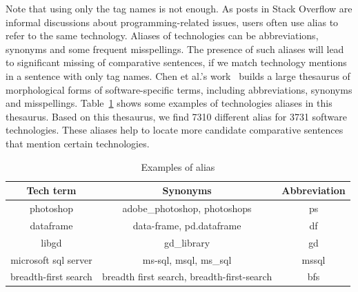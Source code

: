 Note that using only the tag names is not enough.
As posts in Stack Overflow are informal discussions about programming-related issues, users often use alias to refer to the same technology.
Aliases of technologies can be abbreviations, synonyms and some frequent misspellings.
The presence of such aliases will lead to significant missing of comparative sentences, if we match technology mentions in a sentence with only tag names.
Chen et al.'s work~\cite{chen2019sethesaurus} builds a large thesaurus of morphological forms of software-specific terms, including abbreviations, synonyms and misspellings.
Table~\ref{tab:alias} shows some examples of technologies aliases in this thesaurus.
Based on this thesaurus, we find 7310 different alias for 3731 software technologies.
These aliases help to locate more candidate comparative sentences that mention certain technologies.

\begin{table}
	\scriptsize
	\center	
	\caption{Examples of alias}
	\vspace{-4mm}
    \setlength{\tabcolsep}{0.1em}
	\begin{tabular}{c c c}
		\hline
		\textbf{Tech term} & \textbf{Synonyms} & \textbf{Abbreviation} \\
		\hline
		photoshop & adobe\_photoshop, photoshops & ps \\
		dataframe & data-frame, pd.dataframe & df \\
		libgd &  gd\_library & gd \\		
        microsoft sql server & ms-sql, msql, ms\_sql & mssql \\
        		breadth-first search & breadth first search, breadth-first-search & bfs \\
				\hline
	\end{tabular}
	\vspace{-3mm}
	\label{tab:alias}
\end{table}

